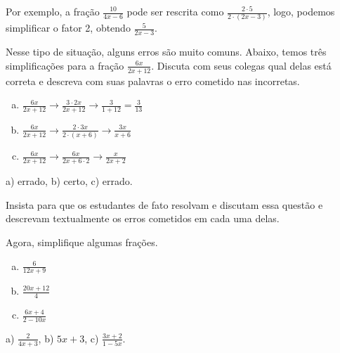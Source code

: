 \documentclass[main_estudante.tex]{subfiles}
\begin{document}
Por exemplo, a fração $\frac{10}{4x-6}$ pode ser rescrita como $\frac{2 \cdot 5}{2 \cdot (2x-3)}$, logo, podemos simplificar o fator 2, obtendo $\frac{5}{2x-3}$.

\begin{questao}
Nesse tipo de situação, alguns erros são muito comuns. Abaixo, temos três simplificações para a fração $\frac{6x}{2x+12}$. Discuta com seus colegas qual delas está correta e descreva com suas palavras o erro cometido nas incorretas.
\begin{enumerate}[a)]
\item $\frac{6x}{2x+12} \longrightarrow \frac{3 \cdot 2x}{2x+12} \longrightarrow \frac{3}{1+12} = \frac{3}{13}$
\item $\frac{6x}{2x+12} \longrightarrow \frac{2 \cdot 3x}{2 \cdot(x+6)} \longrightarrow \frac{3x}{x+6}$
\item $\frac{6x}{2x+12} \longrightarrow \frac{6x}{2x+6 \cdot 2} \longrightarrow \frac{x}{2x+2}$
\end{enumerate}
\end{questao}

\begin{gabarito}
	\begin{gabaritoQuestao}
		a) errado, b) certo, c) errado.
	\end{gabaritoQuestao}
\end{gabarito}

\paraTutores

Insista para que os estudantes de fato resolvam e discutam essa questão e descrevam textualmente os erros cometidos em cada uma delas.

\paraAmbos

\begin{questao}
Agora, simplifique algumas frações.
\begin{enumerate}[a)]
\item $\frac{6}{12x+9}$
\item $\frac{20x+12}{4}$
\item $\frac{6x+4}{2-10x}$
\end{enumerate}
\end{questao}

\begin{gabarito}
	\begin{gabaritoQuestao}
		a) $\frac{2}{4x+3}$, b) $5x+3$, c) $\frac{3x+2}{1-5x}$.
	\end{gabaritoQuestao}
\end{gabarito}
\end{document}
